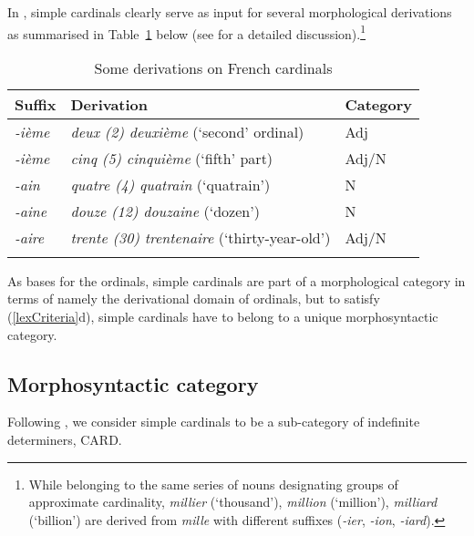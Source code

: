 \documentclass[output=paper]{langsci/langscibook}
\begin{document}
In , simple cardinals  clearly serve as input for several morphological derivations as summarised in Table~\ref{derivCARD} below %
(see \citealt{Saulnier08,FradinSaulnier09,Saulnier10} for a detailed discussion).\footnote{While belonging to the same series of nouns designating groups of approximate cardinality, \emph{millier} (`thousand'), \emph{million} (`million'), \emph{milliard} (`billion') are derived from \emph{mille} with different suffixes (\emph{-ier}, \emph{-ion}, \emph{-iard}).}
\begin{table}
\begin{tabular}{lll}
\lsptoprule
Suffix & Derivation & Category \\
\midrule
\emph{-ième} & \emph{deux (2) \fldr{} deuxième} (`second' ordinal) & Adj \\
\emph{-ième} & \emph{cinq (5) \fldr{} cinquième} (`fifth' part) & Adj/N \\
\emph{-ain} & \emph{quatre (4) \fldr{} quatrain} (`quatrain') & N \\
\emph{-aine} & \emph{douze (12) \fldr{} douzaine} (`dozen') & N \\
\emph{-aire} & \emph{trente (30) \fldr{} trentenaire} (`thirty-year-old') & Adj/N \\
\lspbottomrule
\end{tabular}
\caption{Some derivations on French cardinals \citep[adapted from][201]{FradinSaulnier09}}\label{derivCARD}
\end{table}


As bases for the ordinals, simple cardinals  are part of a morphological category in terms of \cite{vanMarle85} namely the derivational domain of ordinals, but to satisfy (\ref{lexCriteria}d), simple cardinals  have to belong to a unique morphosyntactic category.

\subsection{\textbf{Morphosyntactic category}}\label{catCARD}

Following \cite{Saulnier10}, we consider simple cardinals  to be a sub-category of indefinite determiners, CARD.
\end{document}
